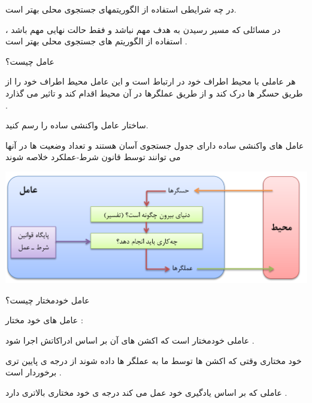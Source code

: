 \documentclass[12pt]{article}
\begin{document}
\vspace{20pt}
\noindent
در چه شرایطی استفاده از الگوریتمهای جستجوی محلی بهتر است.



\begin{tcolorbox}
در مسائلی که مسیر رسیدن به هدف مهم نباشد و فقط حالت نهایی مهم باشد ، استفاده از الگوریتم های جستجوی محلی بهتر است .
\end{tcolorbox}






\newpage
\vspace{20pt}
\noindent
عامل چیست؟


\begin{tcolorbox}
هر عاملی با محیط اطراف خود در ارتباط است و این عامل محیط  اطراف خود را از طریق حسگر ها درک کند و از طریق عملگرها در آن محیط اقدام کند و تاثیر می گذارد .
\end{tcolorbox}




\vspace{20pt}
\noindent
ساختار عامل واکنشی ساده را رسم کنید.


\begin{tcolorbox}
عامل های واکنشی ساده دارای جدول جستجوی آسان هستند و تعداد وضعیت ها در آنها می توانند توسط قانون شرط-عملکرد خلاصه شوند 
\end{tcolorbox}

\begin{center}
	\includegraphics[scale=0.6]{./Untitled.png}
\end{center}


\vspace{20pt}
\noindent
عامل خودمختار چیست؟


\begin{tcolorbox}
\noindent
عامل های خود مختار : 

\noindent
عاملی خودمختار است که اکشن های آن بر اساس ادراکاتش اجرا شود . 

\noindent
خود مختاری وقتی که اکشن ها توسط ما به عملگر ها داده شوند از درجه ی پایین تری برخوردار است .

\noindent
عاملی که بر اساس یادگیری خود عمل می کند درجه ی خود 
مختاری بالاتری دارد .
\end{tcolorbox}
\end{document}
